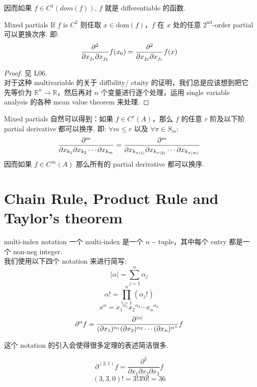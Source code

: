 \documentclass[lang=cn,11pt]{elegantbook}
\begin{document}
\begin{remark}
    因而如果 $f \in C^1(dom(f))$, $f$ 就是 differentiable 的函数.
\end{remark}


\begin{theorem}{Mixed partials}
    If $f$ is $C^2$ 则任取 $x \in \text{dom}(f)$，$f$ 在 $x$ 处的任意 $2^\text{nd}$-order partial 可以更换次序. 即:
    $$
    {\partial^2 \over \partial x_{j_1} \partial x_{j_2}}f(x_0) = {\partial^2 \over \partial x_{j_2} \partial x_{j_1}} f(x)
    $$
\end{theorem}
\begin{proof}
    见 L06.\\
    对于这种 multivariable 的关于 diffbility/ ctnity 的证明，我们总是应该想到把它先等价为 $\mathbb{R}^n \rightarrow \mathbb{R}$，然后再对 $n$ 个变量进行逐个处理，运用 single variable analysis 的各种 mean value theorem 来处理.
\end{proof}


\begin{corollary}{Mixed partials}\label{Mixed partials}
    自然可以得到：如果 $f \in C^r(A)$，那么 $f$ 的任意 $r$ 阶及以下阶 partial derivative 都可以换序. 即: $\forall m \leq r$ 以及 $\forall \pi \in S_m$:
    $$
     {\partial^m \over \partial x_{k_1}\partial x_{k_{2}}\cdots \partial x_{k_m}} = {\partial^m \over \partial x_{k_{\pi(1)}}\partial x_{k_{\pi(2)}}\cdots \partial x_{k_{\pi(m)}}}
    $$
    因而如果 $f\in C^\infty (A)$ 那么所有的 partial derivative 都可以换序.
\end{corollary}


\section{Chain Rule, Product Rule and Taylor's theorem}
\begin{definition}{multi-index notation} \label{multi-index}
一个 multi-index 是一个 $n-$tuple，其中每个 entry 都是一个 non-neg integer.\\
我们使用以下四个 notation 来进行简写:\\
$$
|\alpha| = \sum_{j = 1}^n \alpha_j
$$
$$
\alpha! = \prod_{i = 1}^n (\alpha_j !)
$$
$$
x^{\alpha} = {x_1}^{\alpha_1}{x_2}^{\alpha_2} \cdots {x_n}^{\alpha_n}
$$
$$
\partial ^ \alpha f ={\partial^{|\alpha|} \over (\partial {x_1})^{\alpha_1} (\partial {x_2})^{\alpha_2} \cdots (\partial {x_n})^{\alpha^n}} f  
$$
\end{definition}
这个 notation 的引入会使得很多定理的表述简洁很多.
\begin{example}
$$
\partial ^{(2,1)} f = \frac{\partial^3}{\partial x_1 \partial x_2 \partial x_3 } f
$$
$$
(3,3,0)! = 3!3!0! = 36
$$
\end{example}
\end{document}
